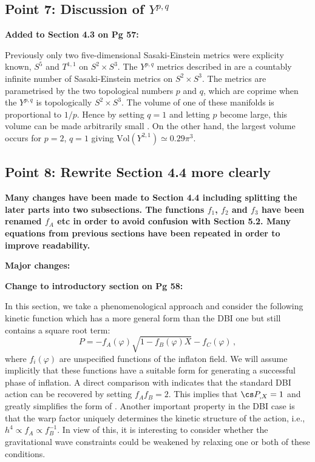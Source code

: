 \subsection{Point 7: Discussion of $Y^{p,q}$}
\textbf{Added to Section 4.3 on Pg 57:}

Previously only two five-dimensional Sasaki-Einstein
metrics were explicity known, $S^5$ and $T^{1,1}$ on $S^2\times S^3$. The $Y^{p,q}$ metrics
described in  are a countably infinite number of Sasaki-Einstein metrics on
$S^2\times S^3$. The metrics are parametrised by the two topological numbers $p$ and $q$, which are
coprime when the $Y^{p,q}$ is topologically $S^2\times S^3$. The volume of one of these manifolds
is proportional to $1/p$. Hence by setting $q=1$ and letting $p$ become large, this volume can be
made arbitrarily small \cite{gauntlett}. On the other hand, the largest volume occurs for $p=2$,
$q=1$ giving $\mathrm{Vol}(Y^{2,1})\simeq 0.29\pi^3$. 

\subsection{Point 8: Rewrite Section 4.4 more clearly}
\textbf{Many changes have been made to Section 4.4 including splitting the later parts into two
subsections. The functions $f_1$, $f_2$ and $f_3$ have been renamed $f_A$ etc in order to avoid
confusion with Section 5.2. Many equations from previous sections have been repeated in order to
improve readability.}

\textbf{Major changes:}

\textbf{Change to introductory section on Pg 58:}

In this section, we take a phenomenological 
approach and consider the following kinetic function which has a more general form than the DBI one
but still contains a square root term:
% 
\begin{equation}
\label{eq:genaction-dbi}
P= -f_A (\varphi ) \sqrt{1-f_B (\varphi ) X} -f_C (\varphi) \,,
\end{equation}
% 
where $f_i (\varphi )$ are unspecified functions of the inflaton 
field. We will assume 
implicitly that these functions have a suitable form for 
generating a successful phase of inflation.
A direct comparison with  
indicates that the standard DBI action can be recovered by setting $f_A f_B =2$. This implies
that $\cs P_{,X} =1$ and greatly simplifies the form of . 
Another important property in the DBI case is that the warp factor uniquely determines 
the kinetic structure of the action, i.e., $h^4 \propto f_A \propto f_B^{-1}$.  
In view of this, it is interesting to consider whether
the gravitational wave constraints could be weakened by relaxing one 
or both of these conditions. 

